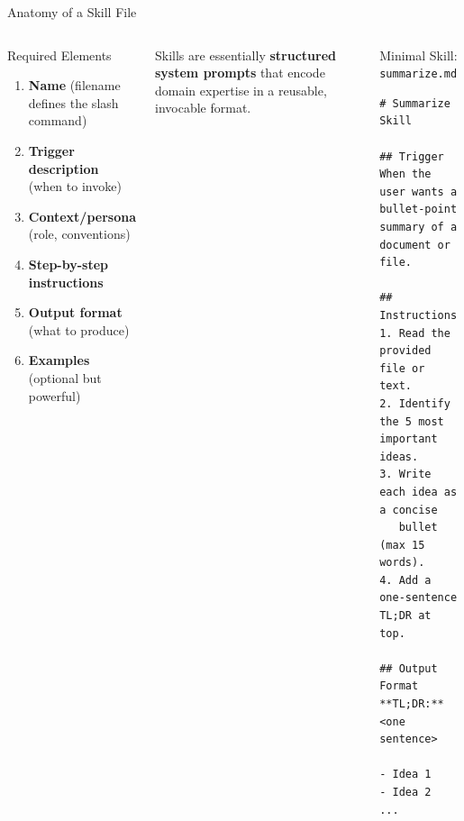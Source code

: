 \documentclass[aspectratio=169,xcolor=dvipsnames]{beamer}
\begin{document}
\begin{frame}[fragile]{Anatomy of a Skill File}
    \begin{columns}
        \begin{block}{Required Elements}
            \begin{enumerate}
                \item \textbf{Name} (filename defines the slash command)
                \item \textbf{Trigger description} (when to invoke)
                \item \textbf{Context/persona} (role, conventions)
                \item \textbf{Step-by-step instructions}
                \item \textbf{Output format} (what to produce)
                \item \textbf{Examples} (optional but powerful)
            \end{enumerate}
        \end{block}
        \vspace{0.2cm}
        Skills are essentially \textbf{structured system prompts} that encode domain expertise in a reusable, invocable format.

        \begin{exampleblock}{Minimal Skill: \texttt{summarize.md}}
                        \begin{lstlisting}[style=MarkdownStyle]
# Summarize Skill

## Trigger
When the user wants a bullet-point
summary of a document or file.

## Instructions
1. Read the provided file or text.
2. Identify the 5 most important ideas.
3. Write each idea as a concise
   bullet (max 15 words).
4. Add a one-sentence TL;DR at top.

## Output Format
**TL;DR:** <one sentence>

- Idea 1
- Idea 2
...
            \end{lstlisting}
        \end{exampleblock}
    \end{columns}
\end{frame}
\end{document}
